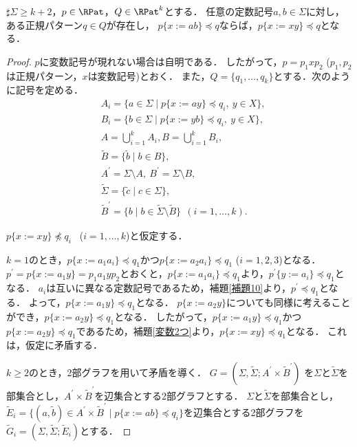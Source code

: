 \begin{lem}\label{追加補題1}
$\sharp \Sigma \ge k+2$，$p \in \RPat$，$Q \in \RPat^{k}$とする．
任意の定数記号$a, b \in \Sigma$に対し，ある正規パターン$q \in Q$が存在し，
$p \{ x:=ab \} \preceq q$ならば，$p \{ x:=xy \} \preceq q$となる．
\end{lem}
\begin{proof}
$p$に変数記号が現れない場合は自明である．
したがって，$p=p_{1}xp_{2}$ ($p_{1},p_{2}$は正規パターン，$x$は変数記号)とおく．
また，$Q=\{ q_{1}, \ldots , q_{k} \}$とする．次のように記号を定める．
\begin{align*}
& A_{i} = \{ a \in \Sigma \mid p \{ x:=ay \} \preceq q_{i},\ y\in X\},\\ 
& B_{i} = \{ b \in \Sigma \mid p \{ x:=yb \} \preceq q_{i},\ y\in X\},\\ 
& A = \bigcup_{i=1}^{k}A_{i},B = \bigcup_{i=1}^{k} B_{i},\\
& \tilde{B} = \{ \tilde{b} \mid b \in B \},\\
& A^{\prime} = \Sigma\setminus A,~B^{\prime} = \Sigma\setminus B,\\
& \tilde{\Sigma} = \{ \tilde{c} \mid c \in \Sigma \},\\
& \tilde{B}^{\prime} = \{ b \mid b \in \tilde{\Sigma} \setminus \tilde{B} \}~~(i=1, \ldots , k).
\end{align*}

$p \{ x:=xy \} \not \preceq q_{i}$ \ ($i=1, \ldots , k$)と仮定する．

$k=1$のとき，$p \{ x:=a_{1}a_{i} \} \preceq q_{1}$かつ$p \{ x:=a_{2}a_{i} \} \preceq q_{1}$ ($i=1,2,3$)となる．
$p^{\prime} = p \{ x:=a_{1}y \} = p_{1}a_{1}yp_{2}$とおくと，$p \{ x:=a_{1}a_{i} \} \preceq q_{1}$より，$p^{\prime} \{ y:=a_{i} \} \preceq q_{1}$となる．
$a_{i}$は互いに異なる定数記号であるため，補題\ref{補題10}より，$p^{\prime} \preceq q_{1}$となる．
よって，$p \{ x:=a_{1}y \} \preceq q_{1}$となる．
$p \{ x:=a_{2}y \}$についても同様に考えることができ，$p \{ x:=a_{2}y \} \preceq q_{1}$となる．
したがって，$p \{ x:=a_{1}y \} \preceq q_{1}$かつ$p \{ x:=a_{2}y \} \preceq q_{1}$であるため，補題\ref{変数2つ}より，$p \{ x:= xy \} \preceq q_{1}$となる．
これは，仮定に矛盾する．

$k \ge 2$のとき，2部グラフを用いて矛盾を導く．
$G=(\Sigma,\tilde{\Sigma}; A^{\prime} \times \tilde{B}^{\prime})$
を$\Sigma$と$\tilde{\Sigma}$を部集合とし，$A^{\prime} \times \tilde{B}^{\prime}$を辺集合とする2部グラフとする．
$\Sigma$と$\tilde{\Sigma}$を部集合とし，$\tilde{E}_{i}=\{ (a, \tilde{b}) \in A^{\prime} \times \tilde{B}^{\prime} \mid p \{ x:=ab \} \preceq q_{i} \}$を辺集合とする2部グラフを$\tilde{G}_{i}=(\Sigma,\tilde{\Sigma}; \tilde{E}_{i})$とする．


\end{proof}
